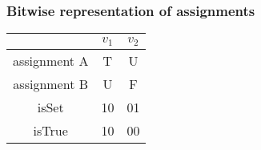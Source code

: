 \documentclass{beamer}
\begin{document}
\begin{frame}
\frametitle{Bitwise representation of assignments}

\begin{center}
\begin{tabular}{ | c | c | c |}
\hline
 & $v_1$ & $v_2$ \\ 
\hline
assignment A & T & U \\  
assignment B & U & F \\    
\hline
isSet & 10 & 01 \\
isTrue & 10 & 00 \\
\hline
\end{tabular}
\end{center}
\end{frame}

%
%
\end{document}
